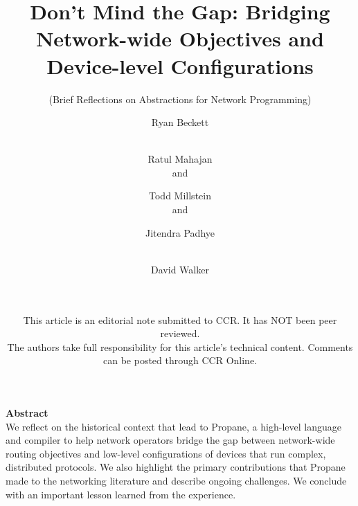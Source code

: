 \documentclass[10pt]{sigalternate052015}
\newcommand{\sysname}{{\small \sf Propane}\xspace}
\begin{document}




\title{Don't Mind the Gap:  Bridging Network-wide Objectives and
  Device-level Configurations}

\subtitle{
  (Brief Reflections on Abstractions
  for Network Programming)
  }



\author{%
Ryan Beckett\\
  \\
\and
Ratul Mahajan\\
   and 
  \\
\and
Todd Millstein\\
   and 
  \\
\and
Jitendra Padhye\\
  \\
\and
David Walker\\
  \\
\and
{
  \begin{tabular}{c}
      \vspace{0.1in} \\
{\normalsize This article is an editorial note submitted to CCR. It has NOT been peer reviewed.}\\
{\normalsize The authors take full responsibility for this article's
technical content. Comments can be posted through CCR Online.}
\end{tabular}
}
}

\maketitle


\noindent
\textbf{Abstract} \\
We reflect on the historical context that lead to 
\sysname,
a high-level language and compiler to help network operators
bridge the gap between network-wide routing objectives and low-level configurations of devices that run complex, distributed protocols.
We also highlight the primary contributions that Propane made to the
networking literature and describe ongoing challenges.
We conclude with an important lesson learned from the experience.
\end{document}
